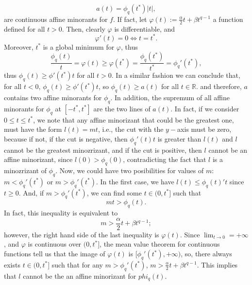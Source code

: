 \[
a(t)=\phi_q(t^*)|t|,
\]
are continuous affine minorants for $f$. If fact, let $\varphi(t):=\frac{\alpha}{2}t+\beta t^{q-1}$ a function defined for all $t>0$. Then, clearly $\varphi$ is differentiable, and
\[
\varphi'(t)=0 \Leftrightarrow t=t^*.
\]
Moreover, $t^*$ is a global minimum for $\varphi$, thus
\[
\frac{\phi_q(t)}{t}=\varphi(t)\ge \varphi(t^*)=\frac{\phi_q(t^*)}{t^*}=\phi_q'(t^*),
\]
thus $\phi_q(t)\ge \phi'(t^*)t$ for all $t>0 $. In a similar fashion we can conclude that, for all $t<0$, $\phi_q(t)\ge \phi'(t^*)t$, so $\phi_q(t)\ge a(t)$ for all $t\in \mathbb{R}$. and therefore, $a$ contains two affine minorants for $\phi_q$. In addition, the supremum of all affine minorants for $\phi_q$ at $[-t^*, t^*]$ are the two lines of $a(t)$. In fact, if we consider $0 \le t\le t^*$, we note that any affine minorizant that could be the greatest one, must have the form $l(t)=mt$, i.e., the cut with the $y-$axis must be zero, because if not, if the cut is negative, then $\phi_q'(t)t$ is greater than $l(t)$ and $l$ cannot be the greatest minozrizant, and if the cut is positive, then $l$ cannot be an affine minorizant, since $l(0)>\phi_q(0)$, contradicting the fact that $l$ is a minozrizant of $\phi_q$. Now, we could have two posibilities for values of $m$: $m<\phi_q'(t^*)$ or $m>\phi_q'(t^*)$. In the first case, we have $l(t)\le \phi_q(t)'t$ since $t\ge 0$. And, if $m>\phi_q'(t^*)$, we can find some $t\in (0,t^*]$ such that 
\[
mt>\phi_q(t).
\]
In fact, this inequality is equivalent to 
\[
m>\frac{\alpha}{2}t+\beta t^{q-1}; 
\]
however, the right hand side of the last inequality is $\varphi(t)$. Since $\lim_{t\to 0}=+\infty$, and $\varphi$ is continuous over $(0,t^*]$, the mean value theorem for continuous functions tell us that the image of $\varphi(t)$ is $[\phi_q'(t^*),+\infty)$, so, there always exists $t\in (0,t^*]$ such that for any $m>\phi_q'(t^*)$, $m>\frac{\alpha}{2}t+\beta t^{q-1}$. This implies that $l$ cannot be the an affine minorizant for $phi_q(t)$.

